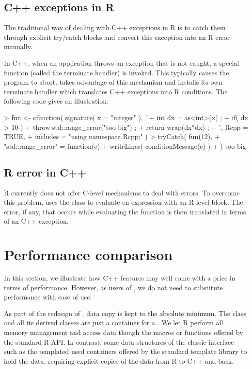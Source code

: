 \subsection{C++ exceptions in R}

The traditional way of dealing with C++ exceptions in R is to
catch them through explicit try/catch blocks and
convert this exception into an R error manually. 

In C++, when an application throws an exception that is not caught, 
a special function (called the terminate handler) is invoked. This typically causes 
the program to abort.  takes advantage of this mechanism
and installs its own terminate handler which translates C++
exceptions into R conditions. The following code gives an illustration. 

\begin{example}
> fun <- cfunction( signature( x = "integer" ), '
+  int dx = as<int>(x) ;
+   if( dx > 10 ) 
+      throw std::range_error("too big") ;
+   return wrap(dx*dx) ;
+ ', Rcpp = TRUE, 
+  includes = "using namespace Rcpp;" )
> tryCatch( fun(12), 
+ "std::range_error" = function(e){
+    writeLines( conditionMessage(e) )
+ } )
too big
\end{example}

\subsection{R error in C++}

R currently does not offer C-level mechanisms to deal with errors. To 
overcome this problem,  uses the 
class to evaluate en expression with an R-level 
block. The error, if any, that occurs while evaluating the 
function is then translated in terms of an C++ exception. 

\section{Performance comparison}

In this section, we illustrate how C++ features may well come with a price
in terms of performance. However, as users of , we do not need to
substitute performance with ease of use.

As part of the redesign of , data copy is kept to the
absolute minimum. The  class and all its derived
classes are just a container for a . We let R perform
all memory management and access data though the macros or functions
offered by the standard R API. In contrast, some data structures
of the classic  interface such as the templated 
 used containers offered by the standard template
library to hold the data, requiring explicit copies of the data 
from R to C++ and back.

